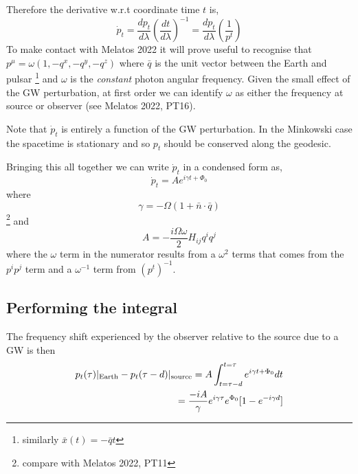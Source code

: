 \documentclass{tufte-handout} %
\begin{document}
\noindent Therefore the derivative w.r.t coordinate time $t$ is,
\begin{equation}
\dot{p}_t = \frac{d p_{t}}{d \lambda} \left(\frac{dt}{d\lambda}\right)^{-1} = \frac{d p_{t}}{d \lambda} \left(\frac{1}{p^t}\right)
\end{equation}
\noindent To make contact with Melatos 2022 it will prove useful to recognise that $p^{\mu} = \omega(1,-q^x,-q^y,-q^z)$ where $\bar{q}$ is the unit vector between the Earth and pulsar \footnote{similarly $\bar{x}(t) = -\bar{q}t$} and $\omega$ is the \textit{constant} photon angular frequency. Given the small effect of the GW perturbation, at first order we can identify $\omega$ as either the frequency at source or observer (see Melatos 2022, PT16). \newline 



\noindent Note that $\dot{p}_t$ is entirely a function of the GW perturbation. In the Minkowski case the spacetime is stationary and so $p_t$ should be conserved along the geodesic.  \newline 


\noindent Bringing this all together we can write $\dot{p}_t$ in a condensed form as,
\begin{equation}
\dot{p}_t = A e^{i \gamma t + \Phi_0}
\end{equation}
where 
\begin{equation}
\gamma = -\Omega (1 + \bar{n}\cdot \bar{q}) 
\end{equation}
\footnote{compare with Melatos 2022, PT11}
\noindent and
\begin{equation}
A = -\frac{i\Omega \omega}{2} H_{ij}q^i q^j 
\end{equation}
where the $\omega$ term in the numerator results from a $\omega^2$ terms that comes from the $p^i p^j$ term and a $\omega^{-1}$ term from $(p^t)^{-1}$.
\subsection{Performing the integral}

The frequency shift experienced by the observer relative to the source due to a GW is then
\begin{align}
p_t(\tau)|_{\rm Earth} - p_t(\tau - d)|_{\rm source} = A \int_{t = \tau - d}^{t=\tau} e^{i \gamma t + \Phi_0}dt  \\
=\frac{-iA}{\gamma} e^{i \gamma \tau}e^{\Phi_0}[1 - e^{-i \gamma d}] 
\label{eq:concise}
\end{align}
\end{document}
